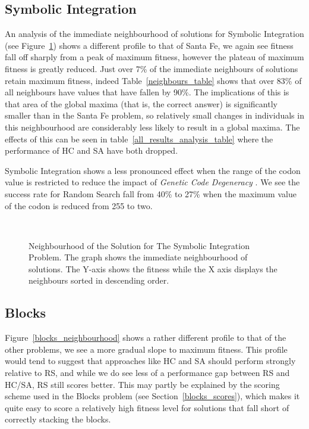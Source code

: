 \subsection{Symbolic Integration}
An analysis of the immediate neighbourhood of solutions for Symbolic Integration (see Figure~\ref{symint_neighbourhood}) shows a different profile to that of Santa Fe, we again see fitness fall off sharply from a peak of maximum fitness, however the plateau of maximum fitness is greatly reduced. Just over 7\% of the immediate neighbours of solutions retain maximum fitness, indeed Table~\ref{neighbours_table} shows that over 83\% of all neighbours have values that have fallen by 90\%.
The implications of this is that area of the global maxima (that is, the correct answer) is significantly smaller than in the Santa Fe problem, so relatively small changes in individuals in this neighbourhood are considerably less likely to result in a global maxima. The effects of this can be seen in table~\ref{all_results_analysis_table} where the performance of HC and SA have both dropped. 

Symbolic Integration shows a less pronounced effect when the range of the codon value is restricted to reduce the impact of \emph{Genetic Code Degeneracy} . We see the success rate for Random Search fall from 40\% to 27\% when the maximum value of the codon is reduced from 255 to two. 
 
\begin{figure}[]
\centerline{\hbox{
}}
\caption[Neighbourhood of the Solution for The Symbolic Integration Problem.]{ Neighbourhood of the Solution for The Symbolic Integration Problem. The graph shows the  immediate neighbourhood of solutions. The Y-axis shows the fitness while the X axis displays the neighbours sorted in descending order.}
\label{symint_neighbourhood}
\end{figure}


\subsection{Blocks}
Figure~\ref{blocks_neighbourhood}  shows a rather different profile to that of the other problems, we see a more gradual slope to maximum fitness. This profile would tend to suggest that approaches like HC and SA should perform strongly relative to RS, and while we do see less of a performance gap between RS and HC/SA, RS still scores better. This may partly be explained by the scoring scheme used in the Blocks problem (see Section~\ref{blocks_scores}), which makes it quite easy to score a relatively high fitness level for solutions that fall short of correctly stacking the blocks. 

